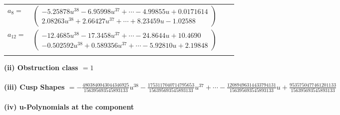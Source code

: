 \documentclass[1p]{elsarticle_modified}
\theoremstyle{definition}
\begin{document}
\begin{tabular}{m{7pt} m{180pt} m{7pt} m{180pt} }
\flushright $a_{8}=$&$\begin{pmatrix}-5.25878 u^{38}-6.95998 u^{37}+\cdots-4.99855 u+0.0171614\\2.08263 u^{38}+2.66427 u^{37}+\cdots+8.23459 u-1.02588\end{pmatrix}$ \\
\flushright $a_{12}=$&$\begin{pmatrix}-12.4685 u^{38}-17.3458 u^{37}+\cdots-24.8644 u+10.4690\\-0.502592 u^{38}+0.589356 u^{37}+\cdots-5.92810 u+2.19848\end{pmatrix}$\\&\end{tabular}
\flushleft \textbf{(ii) Obstruction class $= 1$}\\~\\
\flushleft \textbf{(iii) Cusp Shapes $= -\frac{4803840043044346925}{156395693545893133} u^{38}-\frac{1753117040714795653}{156395693545893133} u^{37}+\cdots-\frac{12089496314433794131}{156395693545893133} u+\frac{9535750477461201133}{156395693545893133}$}\\~\\
\newpage\renewcommand{\arraystretch}{1}
\flushleft \textbf{(iv) u-Polynomials at the component}\newline \\
\end{document}
